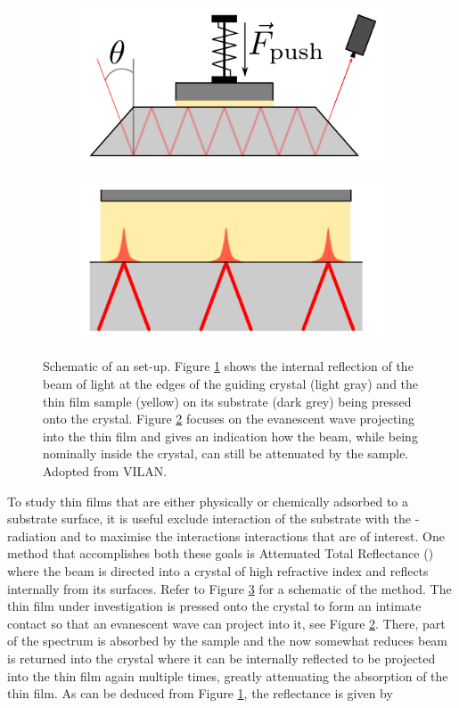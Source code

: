 \begin{figure}
\begin{subfigure}{0.5\textwidth}
\centering
	\includegraphics[width=0.8\linewidth]{./figs/chap1/IRoverview}
	\caption{}
	\label{fig:iroverview}
\end{subfigure}
\begin{subfigure}{0.5\textwidth}
\centering
	\includegraphics[width=0.8\linewidth]{./figs/chap1/IRwave}
	\caption{}
	\label{fig:irwave}
\end{subfigure}
\caption{Schematic of an \atr{} \ftir{} set-up. Figure \ref{fig:iroverview} shows the internal reflection of the beam of light at the edges of the guiding crystal (light gray) and the thin film sample (yellow) on its substrate (dark grey) being pressed onto the crystal. Figure \ref{fig:irwave} focuses on the evanescent wave projecting into the thin film and gives an indication how the beam, while being nominally inside the crystal, can still be attenuated by the sample. Adopted from VILAN.}
\label{fig:irscheme}
\end{figure}
To study thin films that are either physically or chemically adsorbed to a substrate surface, it is useful exclude interaction of the substrate with the \ir{}-radiation and to maximise the interactions interactions that are of interest. One method that accomplishes  both these goals is Attenuated Total Reflectance (\atr{}) \ftir{} where the \ir{} beam is directed into a crystal of high refractive index and reflects internally from its surfaces. Refer to Figure \ref{fig:irscheme} for a schematic of the \atr{} method. The thin film under investigation is pressed onto the crystal to form an intimate contact so that an evanescent \ir{} wave can project into it, see Figure \ref{fig:irwave}. There, part of the \ir{} spectrum is absorbed by the sample and the now somewhat reduces beam is returned into the crystal where it can be internally reflected to be projected into the thin film again multiple times, greatly attenuating the absorption of the thin film. As can be deduced from Figure \ref{fig:iroverview}, the reflectance is given by
